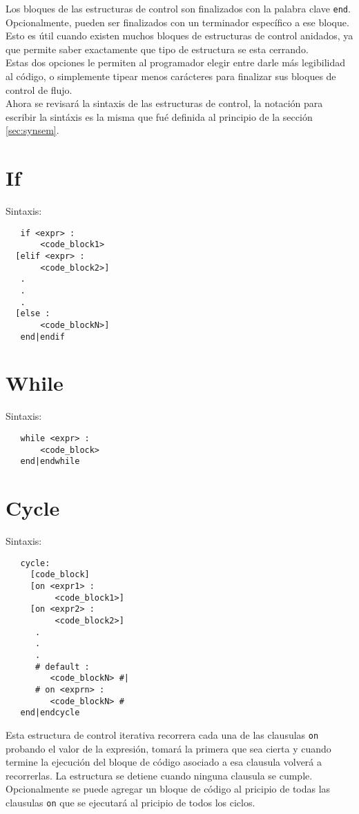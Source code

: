 \documentclass[12pt, spanish]{report}
\begin{document}
Los bloques de las estructuras de control son finalizados con la
palabra clave \texttt{end}. Opcionalmente, pueden ser finalizados con
un terminador espec\'ifico a ese bloque. Esto es \'util cuando existen
muchos bloques de estructuras de control anidados, ya que permite
saber exactamente que tipo de estructura se esta cerrando.\\

Estas dos opciones le permiten al programador elegir entre darle m\'as
legibilidad al c\'odigo, o simplemente tipear menos car\'acteres para
finalizar sus bloques de control de flujo.\\

Ahora se revisar\'a la sintaxis de las estructuras de control, la
notaci\'on para escribir la sint\'axis es la misma que fu\'e definida al
principio de la secci\'on \ref{sec:synsem}.

\section{If}
Sintaxis:
\begin{verbatim}
   if <expr> :
       <code_block1>
  [elif <expr> :
       <code_block2>]
   .
   .
   .
  [else :
       <code_blockN>]
   end|endif
\end{verbatim}

\section{While}
Sintaxis:
\begin{verbatim}
   while <expr> :
       <code_block>
   end|endwhile
\end{verbatim}

\section{Cycle}
Sintaxis:
\begin{verbatim}
   cycle:
     [code_block]
     [on <expr1> :
          <code_block1>]
     [on <expr2> :
          <code_block2>]
      .
      .
      .
      # default :
         <code_blockN> #|
      # on <exprn> :
         <code_blockN> #
   end|endcycle
\end{verbatim}

Esta estructura de control iterativa recorrera cada una de las
clausulas \texttt{on} probando el valor de la expresi\'on, tomar\'a la
primera que sea cierta y cuando termine la ejecuci\'on del bloque de
c\'odigo asociado a esa clausula volver\'a a recorrerlas. La
estructura se detiene cuando ninguna clausula se cumple. Opcionalmente
se puede agregar un bloque de c\'odigo al pricipio de todas las
clausulas \texttt{on} que se ejecutar\'a al pricipio de todos los
ciclos.
\end{document}
